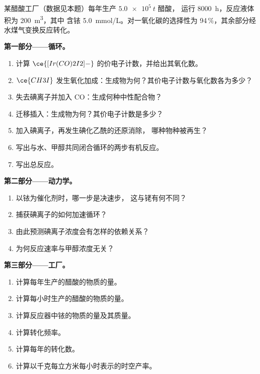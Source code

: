 \begin{problem}
\label{pb:b3:homogeneous-catalysis:1}
某醋酸工厂（数据见本题）每年生产 $\qty{5.0e5}{t}$ 醋酸，
运行 \qty{8000}{h}，反应液体积为 \qty{200}{m^3}，其中
含铱 \qty{5.0}{mmol/L}。对一氧化碳的选择性为 94\,\%，其余部分经
水煤气变换反应转化。

\medskip\noindent\textbf{第一部分——循环。}
\begin{enumerate}
  \item 计算 $\ce{[Ir(CO)2I2]-}$ 的价电子计数，并给出其氧化数。
  \item $\ce{CH3I}$ 发生氧化加成：生成物为何？其价电子计数与氧化数各为多少？
  \item 失去碘离子并加入 CO：生成何种中性配合物？
  \item 迁移插入：生成物为何？其价电子计数是多少？
  \item 加入碘离子，再发生碘化乙酰的还原消除，
        哪种物种被再生？
  \item 写出与水、甲醇共同闭合循环的两步有机反应。
  \item 写出总反应。
\end{enumerate}

\medskip\noindent\textbf{第二部分——动力学。}
\begin{enumerate}[resume]
  \item 以铱为催化剂时，哪一步是决速步，
        这与铑有何不同？
  \item 捕获碘离子的如何加速循环？
  \item 由此预测碘离子浓度会有怎样的依赖关系？
  \item 为何反应速率与甲醇浓度无关？
\end{enumerate}

\medskip\noindent\textbf{第三部分——工厂。}
\begin{enumerate}[resume]
  \item 计算每年生产的醋酸的物质的量。
  \item 计算每小时生产的醋酸的物质的量。
  \item 计算反应器中铱的物质的量及其质量。
  \item 计算转化频率。
  \item 计算每年的转化数。
  \item 计算以千克每立方米每小时表示的时空产率。
\end{enumerate}


\end{problem}
